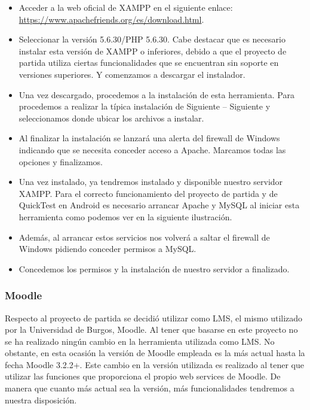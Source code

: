 \begin{itemize}

	\item Acceder a la web oficial de XAMPP en el siguiente enlace:
\url{https://www.apachefriends.org/es/download.html}.

	\item Seleccionar la versión 5.6.30/PHP 5.6.30. Cabe destacar que es necesario instalar esta versión de XAMPP o inferiores, debido a que el proyecto de partida utiliza ciertas funcionalidades que se encuentran sin soporte en versiones superiores. Y comenzamos a descargar el instalador. 
	
	\item Una vez descargado, procedemos a la instalación de esta herramienta. Para procedemos a realizar la típica instalación de Siguiente – Siguiente y seleccionamos donde ubicar los archivos a instalar.
	
	\item Al finalizar la instalación se lanzará una alerta del firewall de Windows indicando que se necesita conceder acceso a Apache. Marcamos todas las opciones y finalizamos. 
	\item Una vez instalado, ya tendremos instalado y disponible nuestro servidor XAMPP. Para el correcto funcionamiento del proyecto de partida y de QuickTest en Android es necesario arrancar Apache y MySQL al iniciar esta herramienta como podemos ver en la siguiente ilustración. 
	
	\item Además, al arrancar estos servicios nos volverá a saltar el firewall de Windows pidiendo conceder permisos a MySQL. 
	
	\item Concedemos los permisos y la instalación de nuestro servidor a finalizado.


\end{itemize}

\subsubsection{Moodle}\label{subsec:moodle}

Respecto al proyecto de partida se decidió utilizar como LMS, el mismo utilizado por la Universidad de Burgos, Moodle. Al tener que basarse en este proyecto no se ha realizado ningún cambio en la herramienta utilizada como LMS.
No obstante, en esta ocasión la versión de Moodle empleada es la más actual hasta la fecha Moodle 3.2.2+. Este cambio en la versión utilizada es realizado al tener que utilizar las funciones que proporciona el propio web services de Moodle. De manera que cuanto más actual sea la versión, más funcionalidades tendremos a nuestra disposición.

